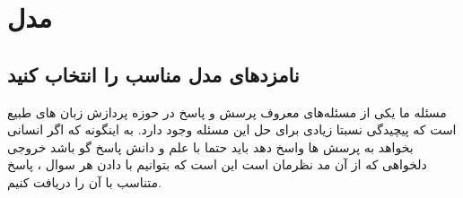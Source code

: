 \section{مدل}

\subsection{نامزدهای مدل مناسب را انتخاب کنید}


مسئله ما یکی از مسئله‌های معروف پرسش و پاسخ در حوزه پردازش زبان های طبیع است که پیچیدگی نسبتا زیادی برای حل این مسئله وجود دارد.
به اینگونه که اگر انسانی بخواهد به پرسش ها واسخ دهد باید حتما با علم و دانش پاسخ گو باشد
خروجی دلخواهی که از آن مد نظرمان است این است که بتوانیم با دادن هر سوال ، پاسخ متناسب با آن را دریافت کنیم.\\

